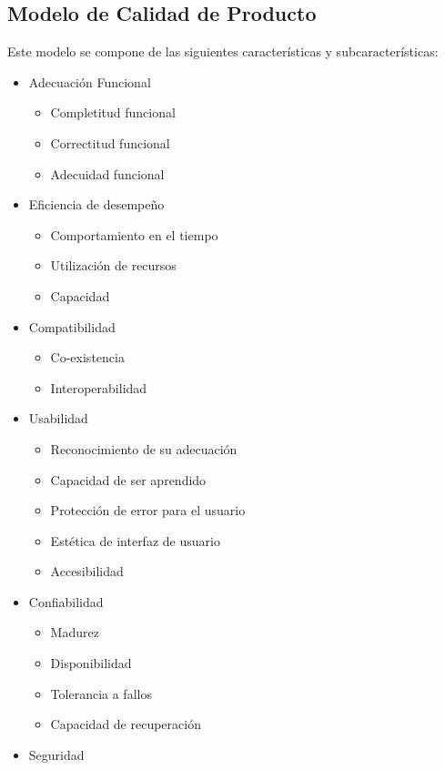\subsection{Modelo de Calidad de Producto}
Este modelo se compone de las siguientes características y subcaracterísticas:

\begin{itemize}
\item Adecuación Funcional
    \begin{itemize}
        \item Completitud funcional
        \item Correctitud funcional
        \item Adecuidad funcional
    \end{itemize}
\item Eficiencia de desempeño
    \begin{itemize}
        \item Comportamiento en el tiempo
        \item Utilización de recursos
        \item Capacidad
    \end{itemize}
\item Compatibilidad
    \begin{itemize}
        \item Co-existencia
        \item Interoperabilidad
    \end{itemize}
\item Usabilidad
    \begin{itemize}
        \item Reconocimiento de su adecuación
        \item Capacidad de ser aprendido
        \item Protección de error para el usuario
        \item Estética de interfaz de usuario
        \item Accesibilidad
    \end{itemize}
\item Confiabilidad
    \begin{itemize}
        \item Madurez
        \item Disponibilidad
        \item Tolerancia a fallos
        \item Capacidad de recuperación
    \end{itemize}
\item Seguridad

\end{itemize}
